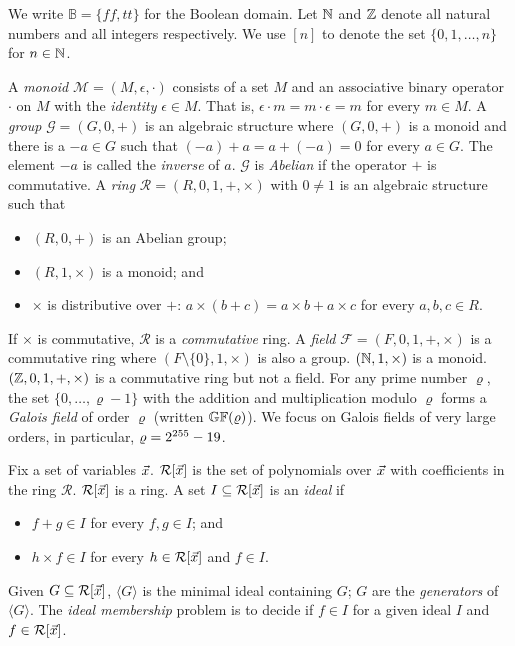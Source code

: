 
We write $\mathbb{B} = \{ \mathit{ff}, \mathit{tt} \}$ for the Boolean
domain. Let $\mathbb{N}$ and $\mathbb{Z}$ denote all natural numbers and all integers
respectively. We use $[n]$ to denote the set $\{ 0, 1, \ldots, n \}$
for $n \in \mathbb{N}$.

A \emph{monoid} $\mathcal{M} = (M, \epsilon, \cdot)$ consists of a set
$M$ and an associative binary operator $\cdot$ on $M$ with the
\emph{identity} $\epsilon \in M$. That is, $\epsilon \cdot m = m \cdot
\epsilon = m$ for every $m \in M$.
A \emph{group} $\mathcal{G} = (G, 0, +)$ is an algebraic structure
where $(G, 0, +)$ is a monoid and there is a $-a \in G$ such that
$(-a) + a = a + (-a) = 0$ for every $a \in G$. The element $-a$ is
called the \emph{inverse} of $a$. $\mathcal{G}$ is \emph{Abelian} if
the operator $+$ is commutative.
A \emph{ring} $\mathcal{R} = (R, 0, 1, +, \times)$ with $0 \neq 1$ is
an algebraic structure such that
\begin{itemize}
\item $(R, 0, +)$ is an Abelian group; 
\item $(R, 1, \times)$ is a monoid; and 
\item $\times$ is distributive over $+$: $a \times (b + c) = a \times
  b + a \times c$ for every $a, b, c \in R$.
\end{itemize}
If $\times$ is commutative, $\mathcal{R}$ is a \emph{commutative}
ring. 
A \emph{field} $\mathcal{F} = (F,
0, 1, +, \times)$ is a commutative ring where $(F\!\setminus\!\{0\}, 1, \times)$ is also
a group. $(\mathbb{N}, 1, \times)$ is a monoid. $(\mathbb{Z}, 0, 1, +, \times)$ 
is a commutative ring but not a field. 
For any prime number $\varrho$, the set $\{ 0, \ldots, \varrho - 1 \}$
with the addition and multiplication modulo $\varrho$ forms a \emph{Galois
field} of order $\varrho$ (written $\mathbb{GF}(\varrho)$).
We focus on Galois fields of very large orders, in particular, $\varrho =
2^{255} - 19$.

Fix a set of variables $\vec{x}$. $\mathcal{R}[\vec{x}]$ is the set of
polynomials over $\vec{x}$ with coefficients in the ring
$\mathcal{R}$. $\mathcal{R}[\vec{x}]$ is a ring. A set $I \subseteq
\mathcal{R}[\vec{x}]$ is an \emph{ideal} if 
\begin{itemize}
\item $f + g \in I$ for every $f, g \in I$; and
\item $h \times f \in I$ for every $h \in
  \mathcal{R}[\vec{x}]$ and $f \in I$. 
\end{itemize}
Given $G \subseteq \mathcal{R}[\vec{x}]$, $\langle G \rangle$ is the
minimal ideal containing $G$; $G$ are the \emph{generators}
of $\langle G \rangle$. The \emph{ideal membership}
problem is to decide if $f \in I$ for a given ideal $I$ and $f
\in \mathcal{R}[\vec{x}]$.

